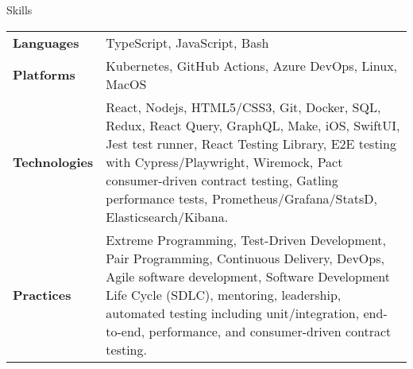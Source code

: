 \begin{section}{Skills}
  \begin{tabularx}{\linewidth}{@{}l X@{}}
    \textbf{Languages} &\small{TypeScript, JavaScript, Bash} \\
    \textbf{Platforms} &\small{Kubernetes, GitHub Actions, Azure DevOps, Linux, MacOS} \\
    \textbf{Technologies} &\small{React, Nodejs, HTML5/CSS3, Git, Docker, SQL, Redux, React Query, GraphQL, Make, iOS, SwiftUI, Jest test runner, React Testing Library, E2E testing with Cypress/Playwright, Wiremock, Pact consumer-driven contract testing, Gatling performance tests, Prometheus/Grafana/StatsD, Elasticsearch/Kibana.} \\
    \textbf{Practices} &\small{Extreme Programming, Test-Driven Development, Pair Programming, Continuous Delivery, DevOps, Agile software development, Software Development Life Cycle (SDLC), mentoring, leadership, automated testing including unit/integration, end-to-end, performance, and consumer-driven contract testing.} \\
  \end{tabularx}
\end{section}
